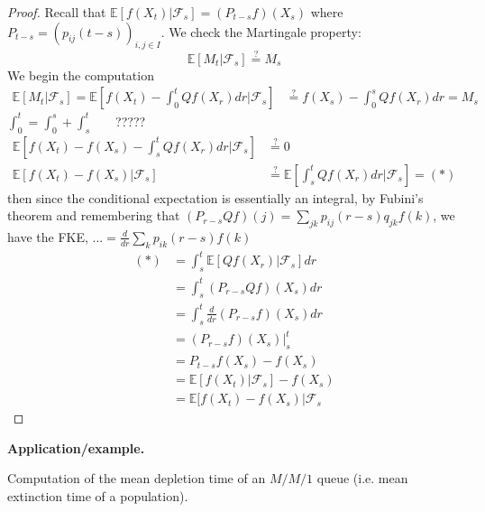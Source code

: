 \documentclass[10pt,a4paper]{article}
\theoremstyle{definition}
\newcommand{\questeq}{\stackrel{?}{=}}
\begin{document}
\begin{proof}
	Recall that $\mathbb{E}[ f( X_{t}) |\mathcal{F}_{s}] =( P_{t-s} f)( X_{s})$ where $P_{t-s} =( p_{ij}( t-s))_{i,j\in I}$. We check the Martingale property:
	\begin{equation*}
		\mathbb{E}[ M_{t} |\mathcal{F}_{s}] \questeq M_{s}
	\end{equation*}
	We begin the computation
	\begin{align*}
		\mathbb{E}[ M_{t} |\mathcal{F}_{s}] =\mathbb{E}\left[ f( X_{t}) -\int _{0}^{t} Qf( X_{r}) dr|\mathcal{F}_{s}\right] & \questeq f( X_{s}) -\int _{0}^{s} Qf( X_{r}) dr=M_{s} 
	\end{align*}
	$\int _{0}^{t} =\int _{0}^{s} +\int _{s}^{t}$ \ \ \ ?????
	\begin{align*}
		\mathbb{E}\left[ f( X_{t}) -f( X_{s}) -\int _{s}^{t} Qf( X_{r}) dr|\mathcal{F}_{s}\right] & \questeq 0                                                                        \\
		\mathbb{E}[ f( X_{t}) -f( X_{s}) |\mathcal{F}_{s}]                                        & \mathbb{\questeq E}\left[\int _{s}^{t} Qf( X_{r}) dr|\mathcal{F}_{s}\right] =( *) 
	\end{align*}
	then since the conditional expectation is essentially an integral, by Fubini's theorem and remembering that $( P_{r-s} Qf)( j) =\sum _{jk} p_{ij}( r-s) q_{jk} f( k)$, we have the FKE, $\dotsc =\frac{d}{dr}\sum _{k} p_{ik}( r-s) f( k)$
	\begin{align*}
		( *) & =\int _{s}^{t}\mathbb{E}[ Qf( X_{r}) |\mathcal{F}_{s}] dr \\
		     & =\int _{s}^{t}( P_{r-s} Qf)( X_{s}) dr                    \\
		     & =\int _{s}^{t}\frac{d}{dr}( P_{r-s} f)( X_{s}) dr         \\
		     & =( P_{r-s} f)( X_{s}) |_{s}^{t}                           \\
		     & =P_{t-s} f( X_{s}) -f( X_{s})                             \\
		     & =\mathbb{E}[ f( X_{t}) |\mathcal{F}_{s}] -f( X_{s})       \\
		     & =\mathbb{E}[ f( X_{t}) -f( X_{s}) |\mathcal{F}_{s}        
	\end{align*}
\end{proof}
\textbf{Application/example.}

Computation of the mean depletion time of an $M/M/1$ queue (i.e. mean extinction time of a population).
\end{document}
